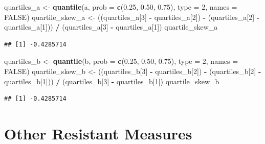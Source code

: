 \documentclass[]{book}
\newenvironment{Shaded}{\begin{snugshade}}{\end{snugshade}}
\newcommand{\DataTypeTok}[1]{\textcolor[rgb]{0.13,0.29,0.53}{#1}}
\newcommand{\DecValTok}[1]{\textcolor[rgb]{0.00,0.00,0.81}{#1}}
\newcommand{\FloatTok}[1]{\textcolor[rgb]{0.00,0.00,0.81}{#1}}
\newcommand{\KeywordTok}[1]{\textcolor[rgb]{0.13,0.29,0.53}{\textbf{#1}}}
\newcommand{\NormalTok}[1]{#1}
\newcommand{\OperatorTok}[1]{\textcolor[rgb]{0.81,0.36,0.00}{\textbf{#1}}}
\newcommand{\OtherTok}[1]{\textcolor[rgb]{0.56,0.35,0.01}{#1}}
\newcommand{\StringTok}[1]{\textcolor[rgb]{0.31,0.60,0.02}{#1}}
\begin{document}
\begin{Shaded}
\begin{Highlighting}[]
\NormalTok{quartiles_a <-}\StringTok{ }\KeywordTok{quantile}\NormalTok{(a, }\DataTypeTok{prob =} \KeywordTok{c}\NormalTok{(}\FloatTok{0.25}\NormalTok{, }\FloatTok{0.50}\NormalTok{, }\FloatTok{0.75}\NormalTok{), }\DataTypeTok{type =} \DecValTok{2}\NormalTok{, }\DataTypeTok{names =} \OtherTok{FALSE}\NormalTok{)}
\NormalTok{quartile_skew_a <-}\StringTok{ }\NormalTok{((quartiles_a[}\DecValTok{3}\NormalTok{] }\OperatorTok{-}\StringTok{ }\NormalTok{quartiles_a[}\DecValTok{2}\NormalTok{]) }\OperatorTok{-}\StringTok{ }\NormalTok{(quartiles_a[}\DecValTok{2}\NormalTok{] }\OperatorTok{-}\StringTok{ }\NormalTok{quartiles_a[}\DecValTok{1}\NormalTok{])) }\OperatorTok{/}\StringTok{ }\NormalTok{(quartiles_a[}\DecValTok{3}\NormalTok{] }\OperatorTok{-}\StringTok{ }\NormalTok{quartiles_a[}\DecValTok{1}\NormalTok{])}
\NormalTok{quartile_skew_a}
\end{Highlighting}
\end{Shaded}

\begin{verbatim}
## [1] -0.4285714
\end{verbatim}

\begin{Shaded}
\begin{Highlighting}[]
\NormalTok{quartiles_b <-}\StringTok{ }\KeywordTok{quantile}\NormalTok{(b, }\DataTypeTok{prob =} \KeywordTok{c}\NormalTok{(}\FloatTok{0.25}\NormalTok{, }\FloatTok{0.50}\NormalTok{, }\FloatTok{0.75}\NormalTok{), }\DataTypeTok{type =} \DecValTok{2}\NormalTok{, }\DataTypeTok{names =} \OtherTok{FALSE}\NormalTok{)}
\NormalTok{quartile_skew_b <-}\StringTok{ }\NormalTok{((quartiles_b[}\DecValTok{3}\NormalTok{] }\OperatorTok{-}\StringTok{ }\NormalTok{quartiles_b[}\DecValTok{2}\NormalTok{]) }\OperatorTok{-}\StringTok{ }\NormalTok{(quartiles_b[}\DecValTok{2}\NormalTok{] }\OperatorTok{-}\StringTok{ }\NormalTok{quartiles_b[}\DecValTok{1}\NormalTok{])) }\OperatorTok{/}\StringTok{ }\NormalTok{(quartiles_b[}\DecValTok{3}\NormalTok{] }\OperatorTok{-}\StringTok{ }\NormalTok{quartiles_b[}\DecValTok{1}\NormalTok{])}
\NormalTok{quartile_skew_b}
\end{Highlighting}
\end{Shaded}

\begin{verbatim}
## [1] -0.4285714
\end{verbatim}

\hypertarget{other-resistant-measures}{%
\section{Other Resistant Measures}\label{other-resistant-measures}}
\end{document}
